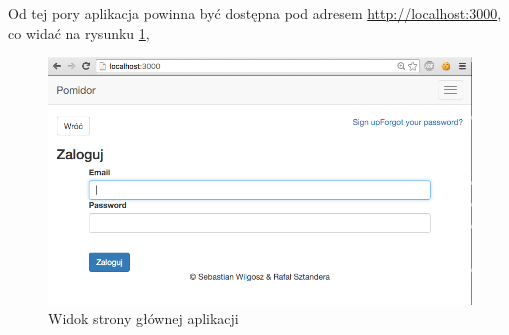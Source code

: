 Od tej pory aplikacja powinna być dostępna pod adresem \url{http://localhost:3000}, co widać na rysunku \ref{figure:root-page-server},

\begin{figure}[ht]
  \centering
  \includegraphics[scale=0.35]{images/root-page-server.png}
  \caption{Widok strony głównej aplikacji}
  \label{figure:root-page-server}
\end{figure}
\FloatBarrier
